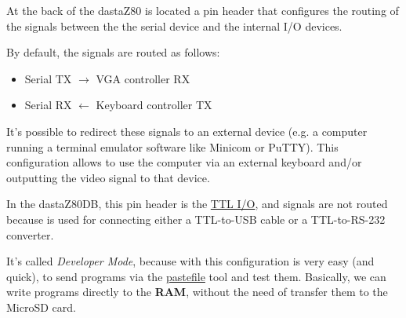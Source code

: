     At the back of the dastaZ80 is located a pin header that configures the
    routing of the signals between the the serial device and the internal I/O
    devices.

    By default, the signals are routed as follows:

    \begin{itemize}
        \item Serial TX $\rightarrow$ VGA controller RX
        \item Serial RX $\leftarrow$ Keyboard controller TX
    \end{itemize}

    It's possible to redirect these signals to an external device (e.g. a
    computer running a terminal emulator software like Minicom or PuTTY). This
    configuration allows to use the computer via an external keyboard and/or
    outputting the video signal to that device.

    In the dastaZ80DB, this pin header is the \hyperref[subsubsection:ttlio]
    {TTL I/O}, and signals are not routed because is used for connecting either
    a TTL-to-USB cable or a TTL-to-RS-232 converter.

    It's called \textit{Developer Mode}, because with this configuration is very
    easy (and quick), to send programs via the \hyperref[software:pastefile]
    {pastefile} tool and test them. Basically, we can write programs directly to
    the \textbf{RAM}, without the need of transfer them to the MicroSD card.